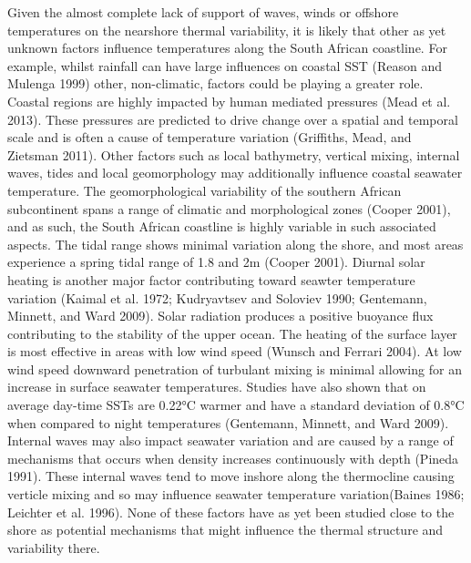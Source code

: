 \documentclass[10pt,a4paper,]{article}
\begin{document}
Given the almost complete lack of support of waves, winds or offshore
temperatures on the nearshore thermal variability, it is likely that
other as yet unknown factors influence temperatures along the South
African coastline. For example, whilst rainfall can have large
influences on coastal SST (Reason and Mulenga 1999) other, non-climatic,
factors could be playing a greater role. Coastal regions are highly
impacted by human mediated pressures (Mead et al. 2013). These pressures
are predicted to drive change over a spatial and temporal scale and is
often a cause of temperature variation (Griffiths, Mead, and Zietsman
2011). Other factors such as local bathymetry, vertical mixing, internal
waves, tides and local geomorphology may additionally influence coastal
seawater temperature. The geomorphological variability of the southern
African subcontinent spans a range of climatic and morphological zones
(Cooper 2001), and as such, the South African coastline is highly
variable in such associated aspects. The tidal range shows minimal
variation along the shore, and most areas experience a spring tidal
range of 1.8 and 2m (Cooper 2001). Diurnal solar heating is another
major factor contributing toward seawter temperature variation (Kaimal
et al. 1972; Kudryavtsev and Soloviev 1990; Gentemann, Minnett, and Ward
2009). Solar radiation produces a positive buoyance flux contributing to
the stability of the upper ocean. The heating of the surface layer is
most effective in areas with low wind speed (Wunsch and Ferrari 2004).
At low wind speed downward penetration of turbulant mixing is minimal
allowing for an increase in surface seawater temperatures. Studies have
also shown that on average day-time SSTs are 0.22°C warmer and have a
standard deviation of 0.8°C when compared to night temperatures
(Gentemann, Minnett, and Ward 2009). Internal waves may also impact
seawater variation and are caused by a range of mechanisms that occurs
when density increases continuously with depth (Pineda 1991). These
internal waves tend to move inshore along the thermocline causing
verticle mixing and so may influence seawater temperature
variation(Baines 1986; Leichter et al. 1996). None of these factors have
as yet been studied close to the shore as potential mechanisms that
might influence the thermal structure and variability there.
\end{document}
